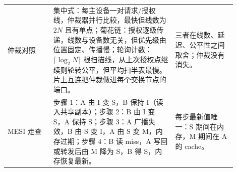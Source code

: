 \begin{longtable}{L{0.18\linewidth}L{0.48\linewidth}L{0.24\linewidth}}
仲裁对照 & 集中式：每主设备一对请求/授权线，仲裁器并行比较，最快但线数为 $2N$ 且有单点；菊花链：授权逐级传递，线数与设备数无关，但优先级由位置固定、传播慢；轮询计数：$\lceil\log_2 N\rceil$ 根扫描线，从上次授权点继续则轮转公平，但平均扫半表最慢。片上互连把仲裁做进每个交换节点的端口。 & 三者在线数、延迟、公平性之间取舍；仲裁没有消失。 \\
MESI 走查 & 步骤 1：A 由 I 变 S，B 保持 I（读入共享副本）；步骤 2：B 由 I 变 S，A 保持 S；步骤 3：A 广播失效，B 由 S 变 I，A 由 S 变 M，内存过期；步骤 4：B 读 miss，A 写回或转发后由 M 降为 S，B 得 S，内存恢复最新。 & 每步最新值唯一：S 期间在内存，M 期间在 A 的 cache。 \\
\bottomrule
\end{longtable}
